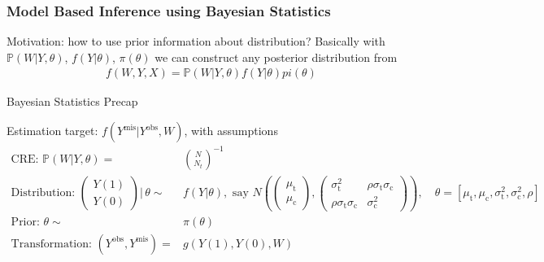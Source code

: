 \subsubsection{Model Based Inference using Bayesian Statistics}
Motivation: how to use prior information about distribution? Basically with $ \mathbb{P}\left( W|Y,\theta  \right)  $, $ f(Y|\theta ) $, $ \pi(\theta ) $ we can construct any posterior distribution from 
\begin{align}
    f(W,Y,X)= \mathbb{P}\left( W|Y,\theta  \right)f(Y|\theta )pi(\theta )
\end{align}


\begin{point}
    Bayesian Statistics Precap
\end{point}

Estimation target: $ f(Y^\mathrm{mis}|Y^\mathrm{obs},W ) $, with assumptions
\begin{align}
    \text{CRE: }\mathbb{P}\left( W|Y,\theta  \right)=&\binom{N}{N_t} ^{-1}\\
    \text{Distribution: }\begin{pmatrix}
        Y(1)\\
        Y(0)
    \end{pmatrix}\Big|\,\theta \sim & f(Y|\theta ),\text{ say } N\left(\begin{pmatrix}
        \mu _\mathrm{t}\\
        \mu _\mathrm{c}      
    \end{pmatrix},\begin{pmatrix}
        \sigma _\mathrm{t}^2& \rho \sigma_\mathrm{t}\sigma _\mathrm{c}\\
        \rho \sigma _\mathrm{t}  \sigma _\mathrm{c}&\sigma _\mathrm{c}^2     
    \end{pmatrix}\right),\quad \theta =[\mu _\mathrm{t},\mu _\mathrm{c} ,\sigma^2_\mathrm{t},\sigma ^2_\mathrm{c} ,\rho ]\\
    \text{Prior: }\theta \sim & \pi (\theta  )\\
    \text{Transformation: }(Y^\mathrm{obs},Y^\mathrm{mis}  )=&g\left(Y(1),Y(0),W\right)
\end{align}

